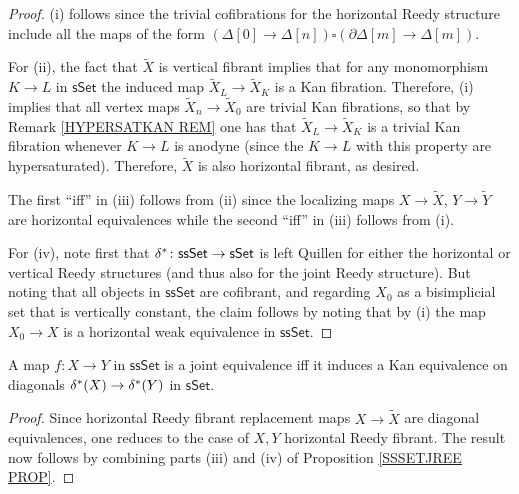 \documentclass[a4paper,10pt
,draft
]{article}%
\begin{document}
\begin{proof}
(i) follows since the trivial cofibrations for the horizontal Reedy structure include all the maps of the form
$(\Delta[0] \to \Delta[n]) \square (\partial \Delta[m] \to \Delta[m])$.

For (ii), the fact that $\tilde{X}$ is vertical fibrant
implies that for any monomorphism $K \to L$ in $\mathsf{sSet}$
the induced map $\tilde{X}_L \to \tilde{X}_K$ is a Kan fibration. Therefore, (i) implies that all vertex maps
$\tilde{X}_{n} \to \tilde{X}_{0}$
are trivial Kan fibrations, so that by
Remark \ref{HYPERSATKAN REM} one has that 
$\tilde{X}_L \to \tilde{X}_K$ is a trivial Kan fibration whenever
$K \to L$ is anodyne
(since the $K \to L$ with this property are hypersaturated).
Therefore, $\tilde{X}$ is also horizontal fibrant, as desired.


The first ``iff'' in (iii) follows from (ii) since the localizing maps 
$X \to \tilde{X}$, $Y \to \tilde{Y}$
are horizontal equivalences
while the second ``iff'' in (iii) follows from (i).

For (iv), note first that 
$\delta^{\**} \colon \mathsf{ssSet} \to \mathsf{sSet}$
is left Quillen for either the horizontal or vertical Reedy structures (and thus also for the joint Reedy structure).
But noting that all objects in $\mathsf{ssSet}$ are cofibrant, and regarding 
$X_{0}$ as a bisimplicial set that is vertically constant, 
the claim follows by noting that by (i) the map
$X_{0} \to X$ is a horizontal weak equivalence in $\mathsf{ssSet}$.
\end{proof}


\begin{corollary}\label{WEAKDIAG COR}
	A map $f\colon X \to Y$ in $\mathsf{ssSet}$ is a joint equivalence iff it induces a Kan equivalence on diagonals
	$\delta^{\**}(X) \to \delta^{\**}(Y)$ in $\mathsf{sSet}$.
\end{corollary}

\begin{proof}
	Since horizontal Reedy fibrant replacement maps
	$X \to \tilde{X}$ are diagonal equivalences, 
	one reduces to the case of $X,Y$ horizontal Reedy fibrant. The result now follows by combining
	parts (iii) and (iv) of Proposition \ref{SSSETJREE PROP}.
\end{proof}
\end{document}
